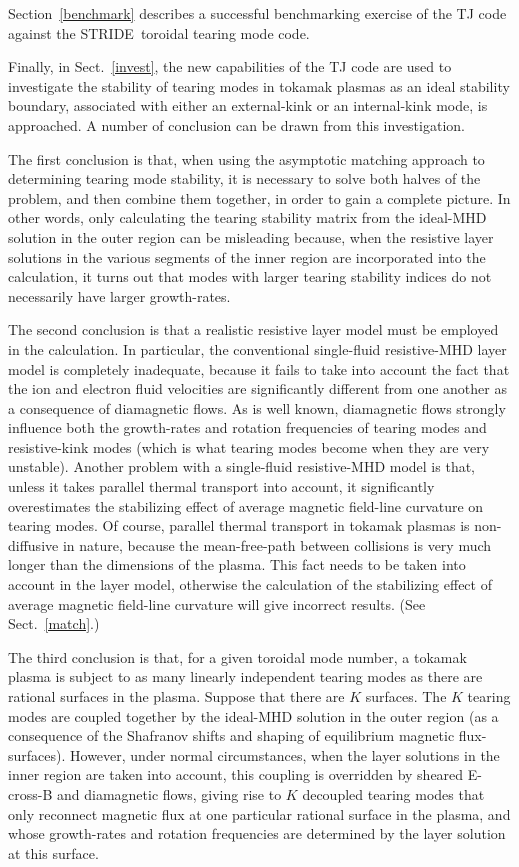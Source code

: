\documentclass[12pt,prb,aps]{revtex4-1}
\begin{document}
Section~\ref{benchmark} describes a successful benchmarking exercise of the TJ code against the STRIDE\,\cite{aglas1} toroidal tearing mode code.

Finally, in Sect.~\ref{invest}, the new capabilities of the TJ code are used to investigate the stability of tearing modes in tokamak plasmas as
an ideal stability boundary, associated with either an external-kink or an internal-kink mode, is  approached. A number of conclusion can be drawn
from this investigation. 

The first conclusion is that, when using the asymptotic matching approach to determining tearing mode stability, it is necessary to
solve both halves of the problem, and then combine them together, in order to gain a complete picture. In other words, only calculating the tearing
stability matrix from the ideal-MHD solution in the outer region can be misleading because, when the resistive layer solutions in the
various segments of the inner region are incorporated into the calculation, it turns out that modes with larger tearing stability indices do not
necessarily have  larger growth-rates. 

The second conclusion is that a realistic resistive layer model must be employed in the calculation. 
In particular, the conventional single-fluid resistive-MHD layer model is completely inadequate, because it fails to take into account the fact that
the ion and electron fluid velocities are significantly different from one another as a consequence of diamagnetic flows. As is well known,
diamagnetic flows strongly influence both the growth-rates and rotation frequencies of tearing modes and resistive-kink modes (which is
what tearing modes become when they are very unstable).\cite{ara} Another problem with a  single-fluid resistive-MHD model is that,
unless it takes parallel thermal transport into account, it significantly overestimates the stabilizing effect of average magnetic
field-line curvature on tearing modes.\cite{lut,con1}  Of course, parallel thermal transport in tokamak plasmas is
non-diffusive in nature, because the mean-free-path between collisions is very much longer than the dimensions of the plasma.\cite{hel,hel1}
This fact  needs to be taken into account in the layer model, otherwise the calculation of the stabilizing  effect of average magnetic
field-line curvature will give incorrect results. (See Sect.~\ref{match}.)

The third conclusion is that, for a given toroidal mode number, a tokamak plasma is subject to as many linearly independent tearing modes as
there are rational surfaces in the plasma. Suppose that there are $K$ surfaces. The $K$ tearing modes are coupled together by the ideal-MHD solution in the outer region (as a
consequence of the Shafranov shifts and shaping of equilibrium magnetic flux-surfaces). However, under normal circumstances,
when the layer solutions in the inner region are taken into account, 
this coupling is overridden by sheared E-cross-B and diamagnetic flows, giving rise to $K$ decoupled tearing modes that only
reconnect magnetic flux at one particular rational surface in the plasma, and whose growth-rates and rotation frequencies are determined by
the layer solution at this surface.\cite{am1} 
\end{document}
